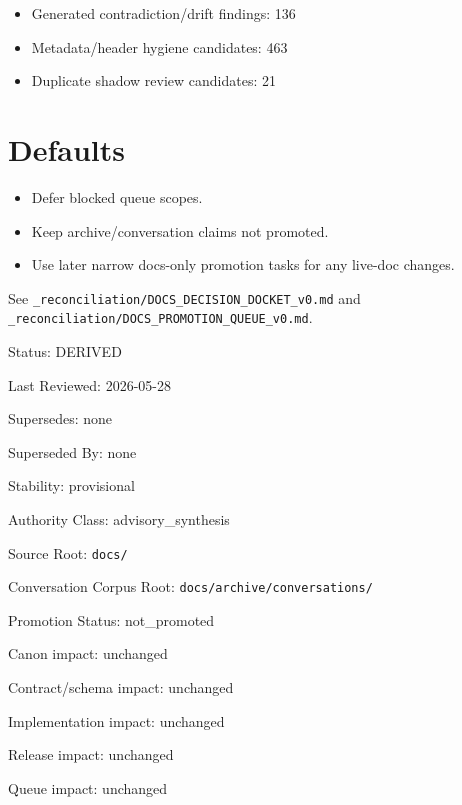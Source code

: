 \documentclass[10.5pt,a4paper]{book}
\begin{document}
\begin{itemize}
\item Generated contradiction/\allowbreak{}drift findings: 136
\item Metadata/\allowbreak{}header hygiene candidates: 463
\item Duplicate shadow review candidates: 21
\end{itemize}

\chapter{Defaults}

\begin{itemize}
\item Defer blocked queue scopes.\allowbreak{}
\item Keep archive/\allowbreak{}conversation claims not promoted.\allowbreak{}
\item Use later narrow docs-\allowbreak{}only promotion tasks for any live-\allowbreak{}doc changes.\allowbreak{}
\end{itemize}

See \texttt{\_\allowbreak{}reconciliation/\allowbreak{}DOCS\_\allowbreak{}DECISION\_\allowbreak{}DOCKET\_\allowbreak{}v0.\allowbreak{}md} and \texttt{\_\allowbreak{}reconciliation/\allowbreak{}DOCS\_\allowbreak{}PROMOTION\_\allowbreak{}QUEUE\_\allowbreak{}v0.\allowbreak{}md}.\allowbreak{}



Status: DERIVED

Last Reviewed: 2026-\allowbreak{}05-\allowbreak{}28

Supersedes: none

Superseded By: none

Stability: provisional

Authority Class: advisory\_\allowbreak{}synthesis

Source Root: \texttt{docs/\allowbreak{}}

Conversation Corpus Root: \texttt{docs/\allowbreak{}archive/\allowbreak{}conversations/\allowbreak{}}

Promotion Status: not\_\allowbreak{}promoted

Canon impact: unchanged

Contract/\allowbreak{}schema impact: unchanged

Implementation impact: unchanged

Release impact: unchanged

Queue impact: unchanged
\end{document}
